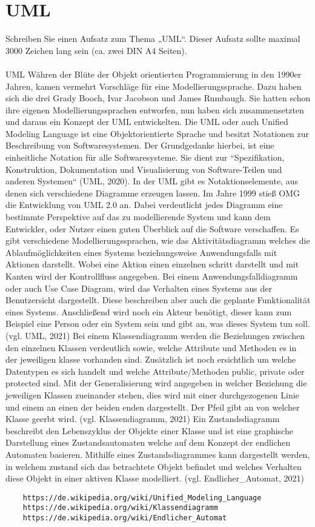 \section{UML}
Schreiben Sie einen Aufsatz zum Thema „UML“. Dieser Aufsatz sollte maximal 3000 Zeichen lang sein (ca. zwei DIN A4 Seiten).\\
\\
UML
Währen der Blüte der Objekt orientierten Programmierung in den 1990er Jahren, kamen vermehrt Vorschläge für eine Modellierungssprache. Dazu haben sich die drei Grady Booch, Ivar Jacobson und James Rumbaugh. Sie hatten schon ihre eigenen Modellierungssprachen entworfen, nun haben sich zusammensetzten und daraus ein Konzept der UML entwickelten. 
Die UML oder auch Unified Modeling Language ist eine Objektorientierte Sprache und besitzt Notationen zur Beschreibung von Softwaresystemen. Der Grundgedanke hierbei, ist eine einheitliche Notation für alle Softwaresysteme. Sie dient zur “Spezifikation, Konstruktion, Dokumentation und Visualisierung von Software-Teilen und anderen Systemen“ (UML, 2020). In der UML gibt es Notaktionselemente, aus denen sich verschiedene Diagramme erzeugen lassen. Im Jahre 1999 stieß OMG die Entwicklung von UML 2.0 an.  Dabei verdeutlicht jedes Diagramm eine bestimmte Perspektive auf das zu modellierende System und kann dem Entwickler, oder Nutzer einen guten Überblick auf die Software verschaffen.
Es gibt verschiedene Modellierungssprachen, wie das Aktivitätsdiagramm welches die Ablaufmöglichkeiten eines Systems beziehungsweise Anwendungsfalls mit Aktionen darstellt. Wobei eine Aktion einen einzelnen schritt darstellt und mit Kanten wird der Kontrollfluss angegeben.
Bei einem Anwendungsfalldiagramm oder auch Use Case Diagram, wird das Verhalten eines Systems aus der Benutzersicht dargestellt. Diese beschreiben aber auch die geplante Funktionalität eines Systems. Anschließend wird noch ein Akteur benötigt, dieser kann zum Beispiel eine Person oder ein System sein und gibt an, was dieses System tun soll. (vgl. UML, 2021)
Bei einem Klassendiagramm werden die Beziehungen zwischen den einzelnen Klassen verdeutlich sowie, welche Attribute und Methoden es in der jeweiligen klasse vorhanden sind. Zusätzlich ist noch ersichtlich um welche Datentypen es sich handelt und welche Attribute/Methoden public, private oder protected sind. Mit der Generalisierung wird angegeben in welcher Beziehung die jeweiligen Klassen zueinander stehen, dies wird mit einer durchgezogenen Linie und einem an einen der beiden enden dargestellt. Der Pfeil gibt an von welcher Klasse geerbt wird. (vgl. Klassendiagramm, 2021)
Ein Zustandsdiagramm beschreibt den Lebenszyklus der Objekte einer Klasse und ist eine graphische Darstellung eines Zustandsautomaten welche auf dem Konzept der endlichen Automaten basieren. Mithilfe eines Zustandsdiagrammes kann dargestellt werden, in welchem zustand sich das betrachtete Objekt befindet und welches Verhalten diese Objekt in einer aktiven Klasse modelliert. (vgl. Endlicher\_Automat, 2021)

\begin{lstlisting}
	https://de.wikipedia.org/wiki/Unified_Modeling_Language
	https://de.wikipedia.org/wiki/Klassendiagramm
	https://de.wikipedia.org/wiki/Endlicher_Automat
\end{lstlisting}